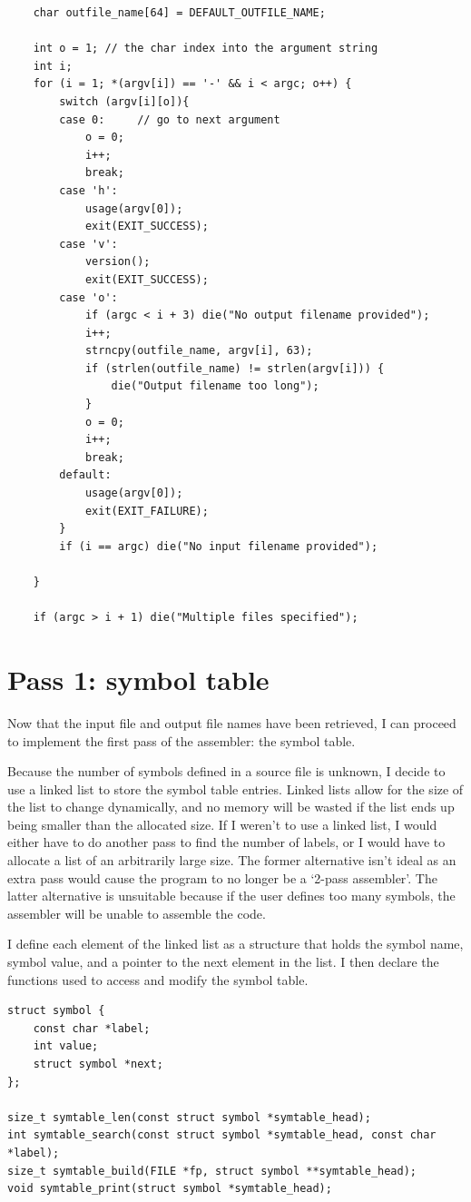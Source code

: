 \documentclass[a4paper]{report}
\begin{document}
\begin{lstlisting}
	char outfile_name[64] = DEFAULT_OUTFILE_NAME;

	int o = 1; // the char index into the argument string
    int i;
    for (i = 1; *(argv[i]) == '-' && i < argc; o++) {
        switch (argv[i][o]){
        case 0:     // go to next argument
            o = 0;
            i++;
            break;
        case 'h':
            usage(argv[0]);
            exit(EXIT_SUCCESS);
        case 'v':
            version();
			exit(EXIT_SUCCESS);
		case 'o':
			if (argc < i + 3) die("No output filename provided");
			i++;
			strncpy(outfile_name, argv[i], 63);
			if (strlen(outfile_name) != strlen(argv[i])) {
				die("Output filename too long");
			}
			o = 0;
			i++;
			break;
        default:
			usage(argv[0]);
			exit(EXIT_FAILURE);
        }
        if (i == argc) die("No input filename provided");

    }

	if (argc > i + 1) die("Multiple files specified");
\end{lstlisting}

\section{Pass 1: symbol table}

Now that the input file and output file names have been retrieved, I can proceed
to implement the first pass of the assembler: the symbol table.

Because the number of symbols defined in a source file is unknown, I decide to
use a linked list to store the symbol table entries. Linked lists allow for the
size of the list to change dynamically, and no memory will be wasted if the
list ends up being smaller than the allocated size. If I weren't to use a linked
list, I would either have to do another pass to find the number of labels, or I
would have to allocate a list of an arbitrarily large size. The former
alternative isn't ideal as an extra pass would cause the program to no longer be
a `2-pass assembler'. The latter alternative is unsuitable because if the user
defines too many symbols, the assembler will be unable to assemble the code.

I define each element of the linked list as a structure that holds the symbol
name, symbol value, and a pointer to the next element in the list. I then declare
the functions used to access and modify the symbol table.

\begin{lstlisting}
struct symbol {
	const char *label;
	int value;
	struct symbol *next;
};

size_t symtable_len(const struct symbol *symtable_head);
int symtable_search(const struct symbol *symtable_head, const char *label);
size_t symtable_build(FILE *fp, struct symbol **symtable_head);
void symtable_print(struct symbol *symtable_head);
\end{lstlisting}
\end{document}
